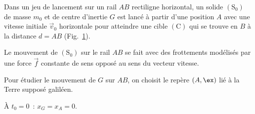 \begin{minipage}{0.65\linewidth}
    Dans un jeu de lancement sur un rail $AB$ rectiligne horizontal, un solide
    $\mathrm{(S_{0})}$ de masse $m_{0}$ et de centre d'inertie $G$ est lancé à
    partir d'une position $A$ avec une vitesse initiale $\vec{v}_{0}$
    horizontale pour atteindre une cible $\mathrm{(C)}$ qui se trouve en $B$ à
    la distance $d=AB$
    (Fig.~\ref{fig:2bac_svt_national_2025_normale_phys_ex3_1}).
    
    Le mouvement de $\mathrm{(S_{0})}$ sur le rail $AB$ se fait avec des
    frottements modélisés par une force $\vec{f}$ constante de sens opposé au
    sens du vecteur vitesse.
\end{minipage}
\hfill
\begin{minipage}{0.34\linewidth}
    \begin{figure}[H]
        \centering
        \caption{}
        \label{fig:2bac_svt_national_2025_normale_phys_ex3_1}
    \end{figure}
\end{minipage}
    
Pour étudier le mouvement de $G$ sur $AB$, on choisit le repère $(A,\ex)$ lié à
la Terre supposé galiléen.
    
À $t_{0}=0$~: $x_{G}=x_{A}=0$.


